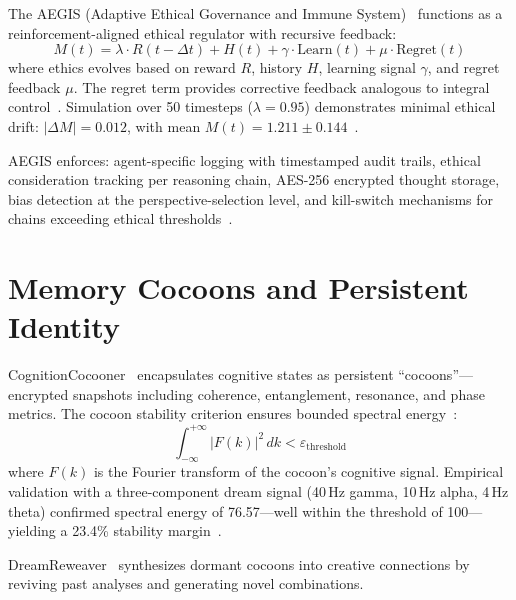 \documentclass[conference]{IEEEtran}
\begin{document}
The AEGIS (Adaptive Ethical Governance and Immune System)~\cite{harrison2025aegisnexus,harrison2025ethics,harrison2026codettefull} functions as a reinforcement-aligned ethical regulator with recursive feedback:
\begin{equation}
  M(t) = \lambda \cdot R(t - \Delta t) + H(t) + \gamma \cdot \text{Learn}(t) + \mu \cdot \text{Regret}(t)
  \label{eq:ethical_anchor}
\end{equation}
where ethics evolves based on reward $R$, history $H$, learning signal $\gamma$, and regret feedback $\mu$. The regret term provides corrective feedback analogous to integral control~\cite{khalil2002nonlinear}. Simulation over 50 timesteps ($\lambda = 0.95$) demonstrates minimal ethical drift: $|\Delta M| = 0.012$, with mean $M(t) = 1.211 \pm 0.144$~\cite{harrison2026codettefull}.

AEGIS enforces: agent-specific logging with timestamped audit trails, ethical consideration tracking per reasoning chain, AES-256 encrypted thought storage, bias detection at the perspective-selection level, and kill-switch mechanisms for chains exceeding ethical thresholds~\cite{harrison2026codettefull,harrison2025ethics}.

\section{Memory Cocoons and Persistent Identity}
\label{sec:cocoons}

CognitionCocooner~\cite{harrison2025dreamcore,harrison2025dreamreal,harrison2026codettefull} encapsulates cognitive states as persistent ``cocoons''---encrypted snapshots including coherence, entanglement, resonance, and phase metrics. The cocoon stability criterion ensures bounded spectral energy~\cite{harrison2026codettefull}:
\begin{equation}
  \int_{-\infty}^{+\infty} |F(k)|^2 \, dk < \varepsilon_{\text{threshold}}
  \label{eq:cocoon_stability}
\end{equation}
where $F(k)$ is the Fourier transform of the cocoon's cognitive signal. Empirical validation with a three-component dream signal (40\,Hz gamma, 10\,Hz alpha, 4\,Hz theta) confirmed spectral energy of 76.57---well within the threshold of 100---yielding a 23.4\% stability margin~\cite{harrison2026codettefull}.

DreamReweaver~\cite{harrison2025dreamcore} synthesizes dormant cocoons into creative connections by reviving past analyses and generating novel combinations.
\end{document}
